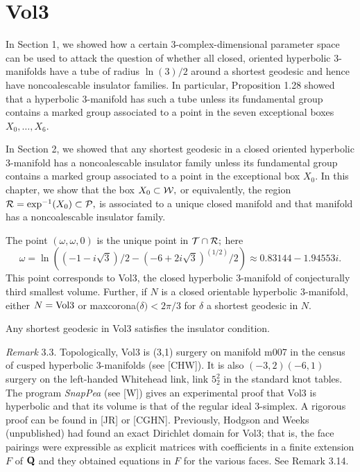  \def\distance{{\rm distance}}
\def\length{{\rm length}}


\section{Vol3}
 
In Section 1, we showed how a certain 3-complex-dimensional
parameter space can be used to attack the question of whether all
closed, oriented hyperbolic $3$-manifolds have a tube of radius
$\ln(3)/2$ around a shortest geodesic and hence have noncoalescable
insulator families.  In particular, Proposition 1.28 showed that a
hyperbolic 3-manifold has such a tube unless its fundamental group
contains a marked  group associated to a point in the seven exceptional
boxes
$X_0,\ldots , X_6$.

In Section 2, we showed that any shortest geodesic in a closed oriented
hyperbolic 3-manifold has a noncoalescable insulator family unless its
fundamental group contains a marked  group associated to a point in
the exceptional box $X_0.$   In this chapter, we show that the box 
$X_0 \subset {\cal W},$ or equivalently,
the region ${\cal R} = \exp^{-1}(X_0) \subset {\cal P},$ is associated to a unique closed manifold and that manifold has a noncoalescable insulator family. 

The point $(\omega, \omega, 0)$ is the unique point in 
${\cal T} \cap {\cal R};$ here $$\omega=
\ln((-1 - i\sqrt3)/2 - (-6 + 2i\sqrt3)^{(1/2)}/2)
\approx 0.83144 - 1.94553i.$$ This point corresponds to {\rm Vol3,} the closed hyperbolic
 $3$\/{\rm -}\/manifold of conjecturally third smallest volume.  Further{\rm ,}
 if $N$ is a closed orientable hyperbolic
$3$\/{\rm -}\/manifold{\rm ,} either $N = {\rm Vol3}$ or {\rm maxcorona(}$\delta) < 2\pi/3$
 for $\delta$ a shortest geodesic in $N.$
\endproclaim

 Any shortest geodesic in  {\rm Vol3} satisfies the insulator condition.
\endproclaim

  {\it Remark} 3.3.
Topologically, Vol3 is (3,1)  surgery on manifold m007 in the census of
cusped hyperbolic 3-manifolds (see [CHW]).  It is also $(-3,2)$\break $(-6,1)$ surgery on the left-handed Whitehead
link,  link $5_2^2$ in the standard knot tables.  The program {\it SnapPea} (see [W]) gives an
experimental proof that Vol3 is hyperbolic and that its volume is that of the
regular ideal $3$-simplex.  A rigorous proof can be found in [JR] or [CGHN].  Previously,
Hodgson and Weeks (unpublished) had found an exact Dirichlet domain for Vol3; that is,  the face
pairings were expressible as explicit matrices with coefficients in a finite
extension $F$ of ${\bf Q}$ and they obtained equations in $F$ for the various faces.  See Remark 3.14.

